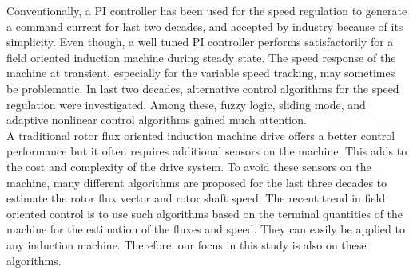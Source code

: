 Conventionally, a PI controller has been used for the speed regulation to generate a command current for last two decades, and accepted by industry because of its simplicity. Even though, a well tuned PI controller performs satisfactorily for a field oriented induction machine during steady state. The speed response of the machine at transient, especially for the variable speed tracking, may sometimes be problematic. In last two decades, alternative control algorithms for the speed regulation were investigated. Among these, fuzzy logic, sliding mode, and adaptive nonlinear control algorithms gained much attention.\\

A traditional rotor flux oriented induction machine drive offers a better control performance but it often requires additional sensors on the machine. This adds to the cost and complexity of the drive system. To avoid these sensors on the machine, many different algorithms are proposed for the last three decades to estimate the rotor flux vector and rotor shaft speed. The recent trend in field oriented control is to use such algorithms based on the terminal quantities of the machine for the estimation of the fluxes and speed. They can easily be applied to any induction machine. Therefore, our focus in this study is also on these algorithms.\\


